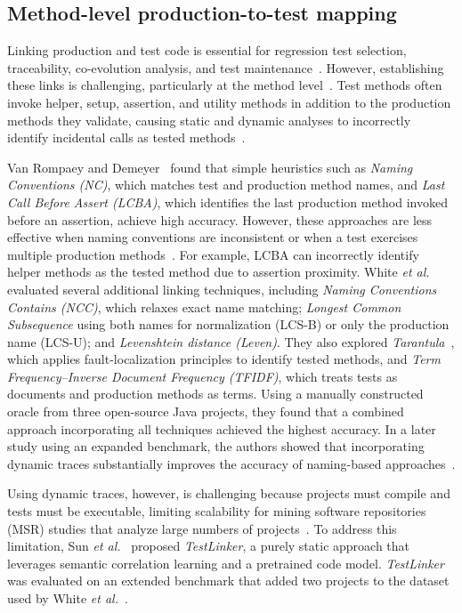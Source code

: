 \subsection{Method-level production-to-test mapping}
Linking production and test code is essential for regression test selection, traceability, co-evolution analysis, and test maintenance~\cite{white_establishing_2020,white_tctracer_2022,sun_method-level_2024,liu_cote_2025}. However, establishing these links is challenging, particularly at the method level~\cite{white_establishing_2020}. Test methods often invoke helper, setup, assertion, and utility methods in addition to the production methods they validate, causing static and dynamic analyses to incorrectly identify incidental calls as tested methods~\cite{white_tctracer_2022,sun_method-level_2024}.

Van Rompaey and Demeyer~\cite{van_rompaey_establishing_2009} found that simple heuristics such as \emph{Naming Conventions (NC)}, which matches test and production method names, and \emph{Last Call Before Assert (LCBA)}, which identifies the last production method invoked before an assertion, achieve high accuracy. However, these approaches are less effective when naming conventions are inconsistent or when a test exercises multiple production methods~\cite{liu_cote_2025,white_tctracer_2022}. For example, LCBA can incorrectly identify helper methods as the tested method due to assertion proximity. White \textit{et al.}~\cite{white_establishing_2020} evaluated several additional linking techniques, including \emph{Naming Conventions Contains (NCC)}, which relaxes exact name matching; \emph{Longest Common Subsequence} using both names for normalization (LCS-B) or only the production name (LCS-U); and \emph{Levenshtein distance (Leven)}. They also explored \emph{Tarantula}~\cite{jones2002visualization}, which applies fault-localization principles to identify tested methods, and \emph{Term Frequency–Inverse Document Frequency (TFIDF)}, which treats tests as documents and production methods as terms. Using a manually constructed oracle from three open-source Java projects, they found that a combined approach incorporating all techniques achieved the highest accuracy. In a later study using an expanded benchmark, the authors showed that incorporating dynamic traces substantially improves the accuracy of naming-based approaches~\cite{white_tctracer_2022}.

Using dynamic traces, however, is challenging because projects must compile and tests must be executable, limiting scalability for mining software repositories (MSR) studies that analyze large numbers of projects~\cite{sun_method-level_2024}. To address this limitation, Sun \textit{et al.}~\cite{sun_method-level_2024} proposed \emph{TestLinker}, a purely static approach that leverages semantic correlation learning and a pretrained code model. \emph{TestLinker} was evaluated on an extended benchmark that added two projects to the dataset used by White \textit{et al.}~\cite{white_tctracer_2022}.

